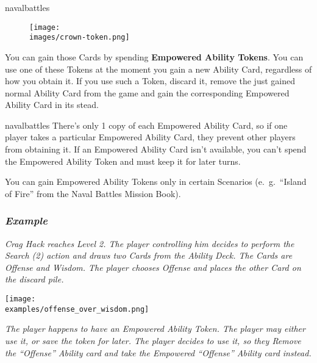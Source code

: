 \begin{multicols*}{2}
\begin{expansion}[before=\vspace*{-11mm}]{navalbattles}
    \setlength\intextsep{0pt}
    \setlength\columnsep{1em}
    \begin{wrapfigure}{r}{0.2\linewidth}
        \texttt{[image: \\images/crown-token.png]}
    \end{wrapfigure}
    You can gain those Cards by spending \textbf{Empowered Ability Tokens}.
    You can use one of these Tokens at the moment you gain a new Ability Card, regardless of how you obtain it.
    If you use such a Token, discard it, remove the just gained normal Ability Card from the game and gain the corresponding Empowered Ability Card in its stead.
\end{expansion}
\columnbreak
\begin{expansion}[before=\vspace*{-11mm}]{navalbattles}
    There's only 1 copy of each Empowered Ability Card, so if one player takes a particular Empowered Ability Card, they prevent other players from obtaining it.
    If an Empowered Ability Card isn't available, you can't spend the Empowered Ability Token and must keep it for later turns.
    \vspace*{1em}

    You can gain Empowered Ability Tokens only in certain Scenarios (e.~g.~``Island of Fire'' from the Naval Battles Mission Book).\\

    \subsubsection*{\textit{Example}}
    \textit{Crag Hack reaches Level 2.
        The player controlling him decides to perform the Search (2) action and draws two Cards from the Ability Deck.
        The Cards are Offense and Wisdom.
        The player chooses Offense and places the other Card on the discard pile.}

    \begin{center}
      \texttt{[image: \\examples/offense\_over\_wisdom.png]}
    \end{center}

    \textit{The player happens to have an Empowered Ability Token.
        The player may either use it, or save the token for later.
        The player decides to use it, so they Remove the ``Offense'' Ability card and take the Empowered ``Offense'' Ability card instead.}


\end{expansion}
\end{multicols*}
